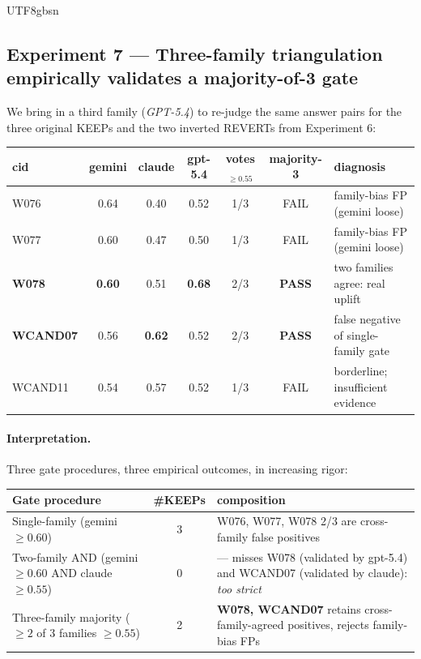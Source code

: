 \documentclass{article}
\begin{document}
\begin{CJK*}{UTF8}{gbsn}
\subsection{Experiment 7 — Three-family triangulation empirically
validates a majority-of-3 gate}
\label{sec:exp7}

We bring in a third family (\emph{GPT-5.4}) to re-judge the same
answer pairs for the three original KEEPs and the two inverted
REVERTs from Experiment 6:

\begin{center}\small
\begin{tabular}{l c c c c c l}
  \toprule
  cid & gemini & claude & gpt-5.4 & votes\(_{\geq 0.55}\)
    & majority-3 & diagnosis \\
  \midrule
  W076 & 0.64 & 0.40 & 0.52 & 1/3 & FAIL
    & family-bias FP (gemini loose) \\
  W077 & 0.60 & 0.47 & 0.50 & 1/3 & FAIL
    & family-bias FP (gemini loose) \\
  \textbf{W078} & \textbf{0.60} & 0.51 & \textbf{0.68} & 2/3
    & \textbf{PASS} & two families agree: real uplift \\
  \textbf{WCAND07} & 0.56 & \textbf{0.62} & 0.52 & 2/3
    & \textbf{PASS} & false negative of single-family gate \\
  WCAND11 & 0.54 & 0.57 & 0.52 & 1/3 & FAIL
    & borderline; insufficient evidence \\
  \bottomrule
\end{tabular}
\end{center}

\paragraph{Interpretation.} Three gate procedures, three empirical
outcomes, in increasing rigor:

\begin{center}\small
\begin{tabular}{l c p{6.5cm}}
  \toprule
  Gate procedure & \#KEEPs & composition \\
  \midrule
  Single-family  (gemini \(\geq 0.60\))              & 3
    & W076, W077, W078\,\,\newline\footnotesize 2/3 are cross-family
      false positives \\
  Two-family AND (gemini \(\geq 0.60\) AND claude \(\geq 0.55\))   & 0
    & —\,\,\newline\footnotesize misses W078 (validated by gpt-5.4)
      and WCAND07 (validated by claude): \emph{too strict} \\
  Three-family majority (\(\geq 2\) of 3 families \(\geq 0.55\))   & 2
    & \textbf{W078, WCAND07}\,\,\newline\footnotesize retains
      cross-family-agreed positives, rejects family-bias FPs \\
  \bottomrule
\end{tabular}
\end{center}


\end{CJK*}
\end{document}

